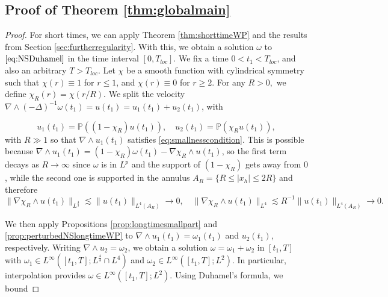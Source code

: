 \documentclass[11pt,a4paper]{article}
\newcommand{\w}{\omega}
\newcommand{\LP}{\mathbb{P}}
\newcommand{\norm}[1]{\|#1\|}
\begin{document}
\subsection{Proof of Theorem \ref{thm:globalmain}}
\begin{proof}
For short times, we can apply Theorem \ref{thm:shorttimeWP} and the results from Section \ref{sec:furtherregularity}. With this, we obtain a solution $\w$ to $\eqref{eq:NSDuhamel}$ in the time interval $[0,T_{loc}]$. We fix a time $0<t_1<T_{loc}$, and also an arbitrary $T>T_{loc}$. Let $\chi$ be a smooth function with cylindrical symmetry such that $\chi(r)\equiv 1$ for $r\leq 1$, and $\chi(r)\equiv 0$ for $r\geq 2$. For any $R>0,$ we define $\chi_R(r)=\chi(r/R)$.
We split the velocity $\nabla\wedge(-\Delta)^{-1}\w(t_1)=u(t_1)=u_1(t_1)+u_2(t_1)$, with

$$u_1(t_1)=\LP ((1-\chi_R) u(t_1)), \quad u_2(t_1)=\LP (\chi_R u(t_1)),$$
with $R\gg1$ so that $\nabla\wedge u_1(t_1)$ satisfies \eqref{eq:smallnesscondition}. This is possible because $\nabla\wedge u_1(t_1)=(1-\chi_R)\w(t_1)-\nabla\chi_R\wedge u(t_1)$, so the first term decays as $R\to \infty$ since $\w$ is in $L^p$ and the support of $(1-\chi_R)$ gets away from $0$, while the second one is supported in the annulus $A_R=\{R\leq |x_h|\leq 2R\}$ and therefore 
$$\norm{\nabla\chi_R\wedge u(t_1)}_{L^{\frac{4}{3}}}\lesssim \norm{u(t_1)}_{L^4(A_R)}\to 0, \quad \norm{\nabla\chi_R\wedge u(t_1)}_{L^{4}}\lesssim R^{-1}\norm{u(t_1)}_{L^4(A_R)}\to 0.$$

We then apply Propositions \ref{prop:longtimesmallpart} and \ref{prop:perturbedNSlongtimeWP} to $\nabla\wedge u_1(t_1)=\w_1(t_1)$ and $u_2(t_1)$, respectively. Writing $\nabla\wedge u_2=\omega_2$, we obtain a solution $\w=\omega_1+\omega_2$ in $[t_1,T]$ with $\w_1\in L^\infty([t_1,T];L^\frac{4}{3}\cap L^4)$ and $\w_2\in L^\infty([t_1,T];L^2)$. In particular, interpolation  provides $\w\in L^\infty([t_1,T];L^2)$. Using Duhamel's formula, we bound


\end{proof}
\end{document}
